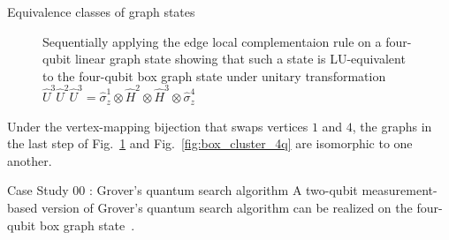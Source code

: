 \documentclass[final]{beamer}
\newlength{\colwidth}
\begin{document}
\begin{frame}[t]
\begin{columns}[t]
\begin{column}{\colwidth}
\begin{block}{Equivalence classes of graph states}
\begin{figure}[H]
\begin{subfigure}[b]{0.25\textwidth}
                        \end{subfigure}%
                        \begin{subfigure}[b]{0.25\textwidth}
                        \end{subfigure}
                        \caption{Sequentially applying the edge local complementaion
                            rule on a four-qubit linear graph state showing that such a
                            state is LU-equivalent to the four-qubit box graph state under
                            unitary transformation $\hat{U}^{3}\hat{U}^{2}\hat{U}^{3} =
                            \hat{\sigma}^{1}_{z}\otimes\hat{H}^{2}\otimes\hat{H}^{3}\otimes\hat{\sigma}^{4}_z$}
                            \label{fig:edge_local_complementation_example}
                    \end{figure}

                    Under the vertex-mapping bijection that swaps vertices $1$ and $4$, the
                    graphs in the last step of
                    Fig.~\ref{fig:edge_local_complementation_example} and
                    Fig.~\ref{fig:box_cluster_4q} are isomorphic to one another.
                \end{block}
                \begin{block}{Case Study 00 : Grover's quantum search algorithm}
                    A two-qubit measurement-based version of Grover's quantum search algorithm can be realized
                    on the four-qubit box graph state~\cite{Walther_2005}.


\end{block}
\end{column}
\end{columns}
\end{frame}
\end{document}
